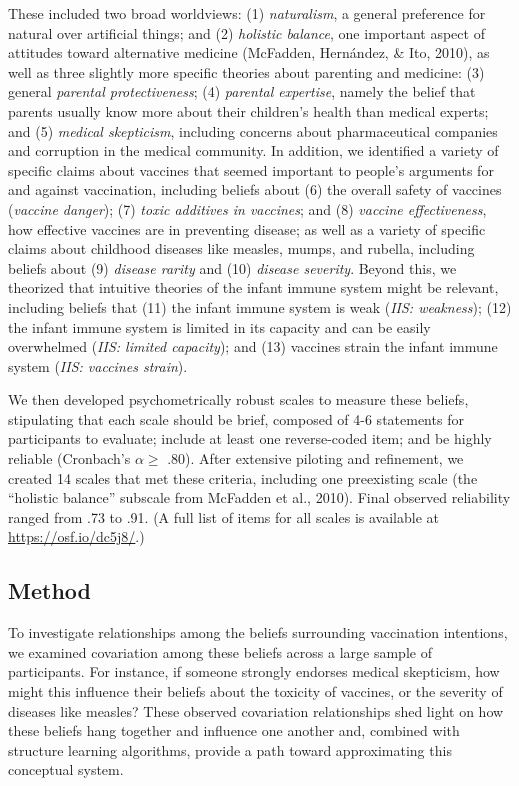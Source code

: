 \documentclass[10pt, letterpaper]{article}
\begin{document}
These included two broad worldviews: (1) \emph{naturalism}, a general
preference for natural over artificial things; and (2) \emph{holistic
balance}, one important aspect of attitudes toward alternative medicine
(McFadden, Hernández, \& Ito, 2010), as well as three slightly more
specific theories about parenting and medicine: (3) general
\emph{parental protectiveness}; (4) \emph{parental expertise}, namely
the belief that parents usually know more about their children's health
than medical experts; and (5) \emph{medical skepticism}, including
concerns about pharmaceutical companies and corruption in the medical
community. In addition, we identified a variety of specific claims about
vaccines that seemed important to people's arguments for and against
vaccination, including beliefs about (6) the overall safety of vaccines
(\emph{vaccine danger}); (7) \emph{toxic additives in vaccines}; and (8)
\emph{vaccine effectiveness}, how effective vaccines are in preventing
disease; as well as a variety of specific claims about childhood
diseases like measles, mumps, and rubella, including beliefs about (9)
\emph{disease rarity} and (10) \emph{disease severity}. Beyond this, we
theorized that intuitive theories of the infant immune system might be
relevant, including beliefs that (11) the infant immune system is weak
(\emph{IIS: weakness}); (12) the infant immune system is limited in its
capacity and can be easily overwhelmed (\emph{IIS: limited capacity});
and (13) vaccines strain the infant immune system (\emph{IIS: vaccines
strain}).

We then developed psychometrically robust scales to measure these
beliefs, stipulating that each scale should be brief, composed of 4-6
statements for participants to evaluate; include at least one
reverse-coded item; and be highly reliable (Cronbach's \(\alpha \geq\)
.80). After extensive piloting and refinement, we created 14 scales that
met these criteria, including one preexisting scale (the ``holistic
balance'' subscale from McFadden et al., 2010). Final observed
reliability ranged from .73 to .91. (A full list of items for all scales
is available at \url{https://osf.io/dc5j8/}.)

\subsection{Method}\label{method}

To investigate relationships among the beliefs surrounding vaccination
intentions, we examined covariation among these beliefs across a large
sample of participants. For instance, if someone strongly endorses
medical skepticism, how might this influence their beliefs about the
toxicity of vaccines, or the severity of diseases like measles? These
observed covariation relationships shed light on how these beliefs hang
together and influence one another and, combined with structure learning
algorithms, provide a path toward approximating this conceptual system.
\end{document}
